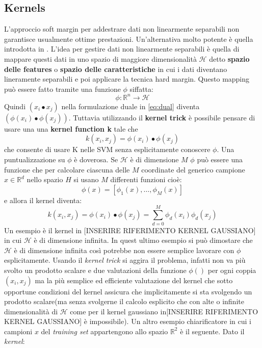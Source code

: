 \subsection{Kernels}
L'approccio soft margin per addestrare dati non linearmente separabili non garantisce usualmente ottime prestazioni. Un'alternativa molto potente è quella introdotta in \cite{Vapnik92}. L'idea per gestire dati non linearmente separabili è quella di mappare questi dati in uno spazio di maggiore dimensionalità $\mathcal{H}$ detto \textbf{spazio delle features} o \textbf{spazio delle caratteristiche} in cui i dati diventano lineramente separabili e poi applicare la tecnica hard margin. Questo mapping può essere fatto tramite una funzione $\phi$ siffatta:
\begin{equation*}
\phi : \mathbb{R}^n \to \mathcal{H}
\end{equation*}
Quindi $(x_i \bullet x_j)$ nella formulazione duale in \eqref{eq:dual} diventa $(\phi(x_i) \bullet \phi(x_j))$. Tuttavia utilizzando il \textbf{kernel trick} è possibile pensare di usare una una \textbf{kernel function k} tale che
\begin{equation}
\label{eq:kerdef}
k(x_i , x_j) = \phi(x_i) \bullet \phi(x_j)
\end{equation}
che consente di usare K nelle \ac{SVM} senza esplicitamente conoscere $\phi$.
Una puntualizzazione su $\phi$ è doverosa. Se $\mathcal{H}$ è di dimensione $M$ $\phi$ può essere una funzione che per calcolare ciascuna delle $M$ coordinate del generico campione $x \in \mathbb{R}^{d}$ nello spazio $H$ si usano $M$ differenti funzioni cioè:
\[
\phi(x) =[\phi_1(x),\dots,\phi_M(x)]
\]
e allora il kernel diventa:
\begin{equation}
k(x_i , x_j) = \phi(x_i) \bullet \phi(x_j) = \sum_{d=0}^{M}\phi_d(x_i)\phi_d(x_j)
\end{equation}
 Un esempio è il kernel in [INSERIRE RIFERIMENTO KERNEL GAUSSIANO] in cui $\mathcal{H}$ è di dimensione infinita. In quest ultimo esempio si può dimostare che $\mathcal{H}$ è di dimensione infinita così potrebbe non essere semplice lavorare con $\phi$ esplicitamente. Usando il \textit{kernel trick} si aggira il problema, infatti non va più svolto un prodotto scalare e due valutazioni della funzione $\phi()$ per ogni coppia $(x_i , x_j)$  ma la più semplice ed efficiente valutazione del kernel che sotto opportune condizioni del kernel assicura che implicitamente si sta svolgendo un prodotto scalare(ma senza svolgerne il calcolo esplicito che con alte o infinite dimensionalità di $\mathcal{H}$ come per il kernel gaussiano in[INSERIRE RIFERIMENTO KERNEL GAUSSIANO] è impossibile). Un altro esempio chiarificatore in cui i campioni $x$ del \textit{training set} appartengono allo spazio $\mathbb{R}^2$ è il seguente. Dato il \textit{kernel}:
